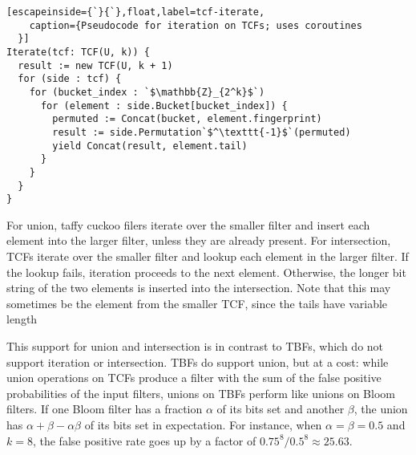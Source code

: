 \documentclass[letterpaper,twocolumn,10pt]{article}
\begin{document}


\begin{lstlisting}[escapeinside={`}{`},float,label=tcf-iterate,
    caption={Pseudocode for iteration on TCFs; uses coroutines
  }]
Iterate(tcf: TCF(U, k)) {
  result := new TCF(U, k + 1)
  for (side : tcf) {
    for (bucket_index : `$\mathbb{Z}_{2^k}$`)
      for (element : side.Bucket[bucket_index]) {
        permuted := Concat(bucket, element.fingerprint)
        result := side.Permutation`$^\texttt{-1}$`(permuted)
        yield Concat(result, element.tail)
      }
    }
  }
}
\end{lstlisting}

For union, taffy cuckoo filers iterate over the smaller filter and insert each element into the larger filter, unless they are already present.
For intersection, TCFs iterate over the smaller filter and lookup each element in the larger filter.
If the lookup fails, iteration proceeds to the next element.
Otherwise, the longer bit string of the two elements is inserted into the intersection.
Note that this may sometimes be the element from the smaller TCF, since the tails have variable length


This support for union and intersection is in contrast to TBFs, which do not support iteration or intersection.
TBFs do support union, but at a cost: while union operations on TCFs produce a filter with the sum of the false positive probabilities of the input filters, unions on TBFs perform like unions on Bloom filters.
If one Bloom filter has a fraction $\alpha$ of its bits set and another $\beta$, the union has $\alpha + \beta - \alpha \beta$ of its bits set in expectation.
For instance, when $\alpha = \beta = 0.5$ and $k = 8$, the false positive rate goes up by a factor of $0.75^8/0.5^8 \approx 25.63$. %
\end{document}
